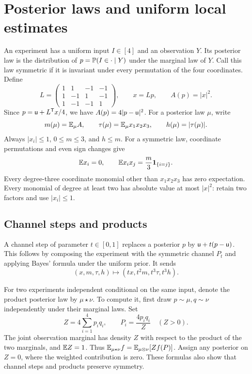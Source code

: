 \section{Posterior laws and uniform local estimates}\label{sec:posterior}

An experiment has a uniform input $I\in[4]$ and an observation $Y$.
Its posterior law is the distribution of
$p=\mathbb P(I\in\cdot\mid Y)$ under the marginal law of $Y$.
Call this law symmetric if it is invariant under every permutation of
the four coordinates. Define
\[
 L=\begin{pmatrix}1&1&-1&-1\\1&-1&1&-1\\1&-1&-1&1\end{pmatrix},
 \qquad x=Lp,\qquad A(p)=|x|^2.
\]
Since $p=\mathsf u+L^{\mathsf T}x/4$, we have
$A(p)=4|p-\mathsf u|^2$. For a posterior law $\mu$, write
\[
 m(\mu)=\mathbb E_\mu A,\qquad
 \tau(\mu)=\mathbb E_\mu x_1x_2x_3,\qquad h(\mu)=|\tau(\mu)|.
\]
Always $|x_i|\leq1$, $0\leq m\leq3$, and $h\leq m$.
For a symmetric law, coordinate permutations and even sign changes give
\begin{equation}\label{eq:symmetry}
 \mathbb E x_i=0,\qquad \mathbb E x_ix_j=\frac m3\mathbf1_{\{i=j\}}.
\end{equation}
Every degree-three coordinate monomial other than $x_1x_2x_3$ has
zero expectation. Every monomial of degree at least two has absolute
value at most $|x|^2$: retain two factors and use $|x_i|\leq1$.

\subsection{Channel steps and products}
A channel step of parameter $t\in[0,1]$ replaces a posterior $p$ by
$\mathsf u+t(p-\mathsf u)$. This follows by composing the experiment with the
symmetric channel $P_t$ and applying Bayes' formula under the uniform
prior. It sends
\begin{equation}\label{eq:scaling}
 (x,m,\tau,h)\longmapsto(tx,t^2m,t^3\tau,t^3h).
\end{equation}

For two experiments independent conditional on the same input, denote
the product posterior law by $\mu\star\nu$. To compute it, first draw
$p\sim\mu,q\sim\nu$ independently under their marginal laws. Set
\begin{equation}\label{eq:bayes}
 Z=4\sum_{i=1}^4p_iq_i,\qquad P_i=\frac{4p_iq_i}{Z}\quad(Z>0).
\end{equation}
The joint observation marginal has density $Z$ with respect to the
product of the two marginals, and $\mathbb E Z=1$. Thus
$\mathbb E_{\mu\star\nu}f=\mathbb E_{\mu\otimes\nu}[Zf(P)]$.
Assign any posterior on $Z=0$, where the weighted contribution is zero.
These formulas also show that channel steps and products preserve
symmetry.

